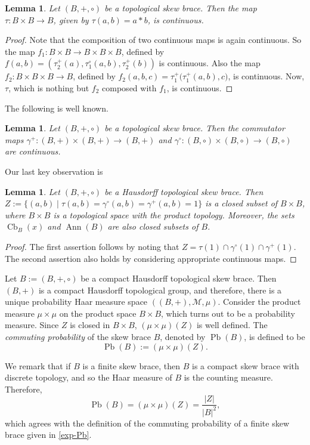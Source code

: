 \documentclass[oneside]{amsart}
\numberwithin{equation}{section}
\theoremstyle{plain}
\newtheorem{lem}[equation]{Lemma}
\theoremstyle{definition}
\newcommand{\Cb}{\operatorname{Cb} }
\newcommand{\Pb}{\operatorname{Pb} }
\newcommand{\Ann}{\operatorname{Ann} }
\begin{document}
\begin{lem}
Let $(B, +, \circ)$ be a topological skew brace. Then the map $\tau : B \times B \to B$, given by $\tau(a, b) = a * b$, is continuous.    
\end{lem} 
\begin{proof}
 Note that the composition of two continuous maps is again continuous. So the map $f_1: B \times B \to B \times B \times B$, defined by $f(a, b) = (\tau_2^+(a), \tau_1^{\circ}(a, b), \tau_2^+(b))$ is continuous.  Also the map $f_2:  B \times B \times B \to B$, defined by $f_2(a, b, c) = \tau_1^+\big(\tau_1^+(a, b), c\big)$, is continuous. Now, $\tau$, which is nothing but $f_2$ composed with $f_1$, is continuous.
\end{proof}

The following is well known.
\begin{lem}
Let $(B, +, \circ)$ be a topological skew brace. Then the commutator maps $\gamma^+ : (B, +) \times (B, +) \to (B, +)$ and  $\gamma^{\circ} : (B, \circ) \times (B, \circ) \to (B, \circ)$ are continuous.
\end{lem}

Our last key observation is 
\begin{lem}
Let $(B, +, \circ)$ be a Hausdorff topological skew brace. Then $Z:= \{(a, b) \mid \tau(a, b) = \gamma^{\circ}(a, b) = \gamma^+(a, b) = 1\}$ is a closed subset of $B \times B$, where  $B \times B$ is a topological space with the product topology. Moreover, the sets  $\Cb_B(x)$ and $\Ann(B)$ are also closed subsets of $B$. 
\end{lem}
\begin{proof}
The first  assertion follows by noting that $Z = \tau(1) \cap \gamma^{\circ}(1) \cap \gamma^+(1)$. The second assertion also holds by considering appropriate continuous maps.
\end{proof}


    Let $B := (B,+, \circ)$ be a compact Hausdorff topological skew brace. Then $(B,+)$ is a compact Hausdorff topological group, and therefore,  there is a unique probability Haar measure space $((B, +), \mathcal{M}, \mu)$.  Consider the product measure $\mu\times \mu$ on the product space $B\times B$, which turns out to be  a probability measure. Since $Z$ is closed in $B \times B$, $(\mu \times \mu)(Z)$ is well defined. The \emph{commuting probability} of the skew brace $B$, denoted by  $\Pb(B)$, is defined to be
$$\Pb(B) := (\mu\times \mu)(Z).$$ 


We remark that if $B$ is a finite skew brace, then $B$ is a compact skew brace with discrete topology, 
and so the Haar measure of $B$ is the counting measure. Therefore, 
\[
\Pb(B) = (\mu\times \mu)(Z) = \frac{|Z|}{|B|^2},
\]
which agrees with the definition of the commuting probability of a finite skew brace given in  \eqref{exp-Pb}. 
\end{document}

